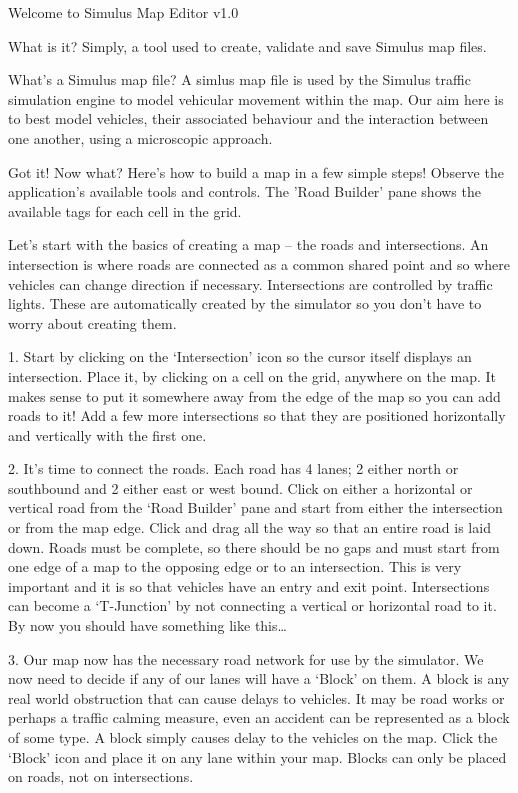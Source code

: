 \documentclass[12pt,a4paper]{article}
\begin{document}
Welcome to Simulus Map Editor v1.0

What is it?
Simply, a tool used to create, validate and save Simulus map files. 
 
What's a Simulus map file?
A simlus map file is used by the Simulus traffic simulation engine to model vehicular movement within the map.  Our aim here is to best model vehicles, their associated behaviour and the interaction between one another, using a microscopic approach. 

Got it!  Now what?
Here’s how to build a map in a few simple steps!  
Observe the application's available tools and controls.  The 'Road Builder' pane shows the available tags for each cell in the grid.  

Let’s start with the basics of creating a map – the roads and intersections.  An intersection is where roads are connected as a common shared point and so where vehicles can change direction if necessary.  Intersections are controlled by traffic lights.  These are automatically created by the simulator so you don’t have to worry about creating them. 

1.	Start by clicking on the ‘Intersection’ icon so the cursor itself displays an intersection.  Place it, by clicking on a cell on the grid, anywhere on the map.  It makes sense to put it somewhere away from the edge of the map so you can add roads to it!  Add a few more intersections so that they are positioned horizontally and vertically with the first one.

2.	It’s time to connect the roads.  Each road has 4 lanes; 2 either north or southbound and 2 either east or west bound.  Click on either a horizontal or vertical road from the ‘Road Builder’ pane and start from either the intersection or from the map edge.  Click and drag all the way so that an entire road is laid down.  Roads must be complete, so there should be no gaps and must start from one edge of a map to the opposing edge or to an intersection.  This is very important and it is so that vehicles have an entry and exit point.  Intersections can become a ‘T-Junction’ by not connecting a vertical or horizontal road to it.  By now you should have something like this…
 
3.	Our map now has the necessary road network for use by the simulator.  We now need to decide if any of our lanes will have a ‘Block’ on them.  A block is any real world obstruction that can cause delays to vehicles.  It may be road works or perhaps a traffic calming measure, even an accident can be represented as a block of some type.  A block simply causes delay to the vehicles on the map.  Click the ‘Block’ icon and place it on any lane within your map. Blocks can only be placed on roads, not on intersections.
\end{document}
